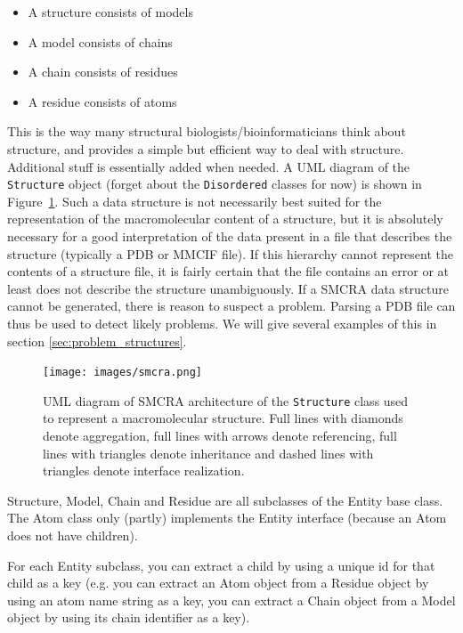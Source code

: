 \begin{itemize}
\item A structure consists of models
\item A model consists of chains
\item A chain consists of residues
\item A residue consists of atoms
\end{itemize}
This is the way many structural biologists/bioinformaticians think
about structure, and provides a simple but efficient way to deal with
structure. Additional stuff is essentially added when needed. A UML
diagram of the \texttt{Structure} object (forget about the \texttt{Disordered}
classes for now) is shown in Figure~\ref{fig:smcra}. Such a data structure is not
necessarily best suited for the representation of the macromolecular content of
a structure, but it is absolutely necessary for a good interpretation of the
data present in a file that describes the structure (typically a PDB or MMCIF
file). If this hierarchy cannot represent the contents of a structure file, it
is fairly certain that the file contains an error or at least does not describe
the structure unambiguously. If a SMCRA data structure cannot be generated,
there is reason to suspect a problem. Parsing a PDB file can thus be used to
detect likely problems. We will give several examples of this in section
\ref{sec:problem_structures}.

\begin{figure}[htbp]
\begin{htmlonly}
\end{htmlonly}
\begin{latexonly}
\centering
\texttt{[image: images/smcra.png]}
\end{latexonly}
\caption{UML diagram of SMCRA architecture of the \texttt{Structure} class used to represent a macromolecular structure.
Full lines with diamonds denote aggregation, full lines with
arrows denote referencing, full lines with triangles denote inheritance
and dashed lines with triangles denote interface realization.}
\label{fig:smcra}
\end{figure}

Structure, Model, Chain and Residue are all subclasses of the Entity base class.
The Atom class only (partly) implements the Entity interface (because an Atom
does not have children).

For each Entity subclass, you can extract a child by using a unique id for that
child as a key (e.g. you can extract an Atom object from a Residue object by
using an atom name string as a key, you can extract a Chain object from a Model
object by using its chain identifier as a key).

